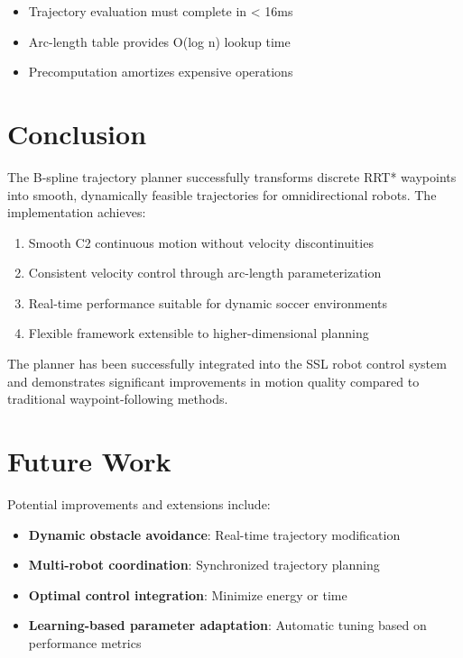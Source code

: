 \documentclass[11pt]{article}
\begin{document}
\begin{itemize}
    \item Trajectory evaluation must complete in < 16ms
    \item Arc-length table provides O(log n) lookup time
    \item Precomputation amortizes expensive operations
\end{itemize}

\section{Conclusion}

The B-spline trajectory planner successfully transforms discrete RRT* waypoints into smooth, dynamically feasible trajectories for omnidirectional robots. The implementation achieves:

\begin{enumerate}
    \item Smooth C2 continuous motion without velocity discontinuities
    \item Consistent velocity control through arc-length parameterization
    \item Real-time performance suitable for dynamic soccer environments
    \item Flexible framework extensible to higher-dimensional planning
\end{enumerate}

The planner has been successfully integrated into the SSL robot control system and demonstrates significant improvements in motion quality compared to traditional waypoint-following methods.

\section{Future Work}

Potential improvements and extensions include:

\begin{itemize}
    \item \textbf{Dynamic obstacle avoidance}: Real-time trajectory modification
    \item \textbf{Multi-robot coordination}: Synchronized trajectory planning
    \item \textbf{Optimal control integration}: Minimize energy or time
    \item \textbf{Learning-based parameter adaptation}: Automatic tuning based on performance metrics
\end{itemize}
\end{document}
